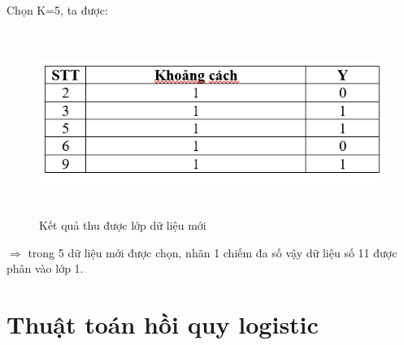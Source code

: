 \documentclass{report}
\begin{document}
    \indent Chọn K=5, ta được:
    \begin{center}
        \begin{figure}[htp]
    	\begin{center}
    		\includegraphics[width=15cm, height=6cm]{images/kqknn.png}
    	\end{center}
    		\caption{Kết quả thu được lớp dữ liệu mới}
    \end{figure}
    \end{center}
  $\Rightarrow$ trong 5 dữ liệu mới được chọn, nhãn 1 chiếm đa số vậy dữ liệu số 11 được phân vào lớp 1.
 
\fontsize{14}{10}\selectfont
\section{Thuật toán hồi quy logistic}
\end{document}
